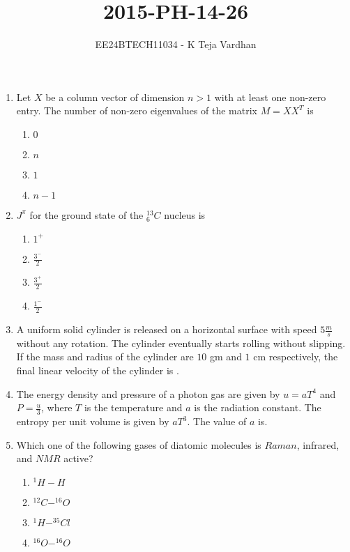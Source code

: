 \documentclass{article}
\newcommand{\gt}{>}
\begin{document}

\title{2015-PH-14-26}
\author{EE24BTECH11034 - K Teja Vardhan}
{\let\newpage\relax\maketitle}

\begin{enumerate}

\item Let $X$ be a column vector of dimension $n \gt 1$ with at least one non-zero entry. The number of non-zero eigenvalues of the matrix $M = XX^T$ is

\begin{enumerate}
    \item $0$
    \item $n$
    \item $1$
    \item $n-1$
\end{enumerate}

\item $J^\pi$ for the ground state of the $^{13}_6C$ nucleus is

\begin{enumerate}
    \item $1^+$
    \item $\frac{3^-}{2}$
    \item $\frac{3^+}{2}$
    \item $\frac{1^-}{2}$
\end{enumerate}

\item A uniform solid cylinder is released on a horizontal surface with speed $5 \frac{m}{s}$ without any rotation. The cylinder eventually starts rolling without slipping. If the mass and radius of the cylinder are $10$ gm and $1$ cm respectively, the final linear velocity of the cylinder is .

\item The energy density and pressure of a photon gas are given by $u = aT^4$ and $P = \frac{u}{3}$, where $T$ is the temperature and $a$ is the radiation constant. The entropy per unit volume is given by $aT^3$. The value of $a$ is.

\item Which one of the following gases of diatomic molecules is $Raman$, infrared, and $NMR$ active?

\begin{enumerate}
    \item $^1H-H$
    \item $^{12}C-^{16}O$
    \item $^1H-^{35}Cl$
    \item $^{16}O-^{16}O$
\end{enumerate}


\end{enumerate}
\end{document}

